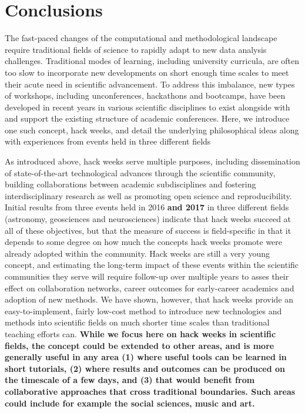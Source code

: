 
\section*{Conclusions}

The fast-paced changes of the computational and methodological landscape require traditional fields of science to rapidly adapt to new data analysis challenges.
Traditional modes of learning, including university curricula, are often too slow to incorporate new developments on short enough time scales to meet their acute need in scientific advancement.
To address this imbalance, new types of workshops, including unconferences, hackathons and bootcamps, have been developed in recent years in various scientific disciplines to exist alongside with and support the existing structure of academic conferences.
Here, we introduce one such concept, hack weeks, and detail the underlying philosophical ideas along with experiences from events held in three different fields

As introduced above, hack weeks serve multiple purposes, including dissemination of state-of-the-art technological advances through the scientific community, building collaborations between academic subdisciplines and fostering interdisciplinary research as well as  promoting open science and reproducibility.
Initial results from three events held in 2016 \textbf{and 2017} in three different fields (astronomy, geosciences and neurosciences) indicate that hack weeks succeed at all of these objectives, but that the measure of success is field-specific in that it depends to some degree on how much the concepts hack weeks promote were already adopted within the community.
Hack weeks are still a very young concept, and estimating the long-term impact of these events within the scientific communities they serve will require follow-up over multiple years to asses their effect on collaboration networks, career outcomes for early-career academics and adoption of new methods.
We have shown, however, that hack weeks provide an easy-to-implement, fairly low-cost method to introduce new technologies and methods into scientific fields on much shorter time scales than traditional teaching efforts can.
\textbf{While we focus here on hack weeks in scientific fields, the concept could be extended to other areas, and is more generally useful in any area (1) where useful tools can be learned in short tutorials, (2) where results and outcomes can be produced on the timescale of a few days, and (3) that would benefit from collaborative approaches that cross traditional boundaries. Such areas could include for example the social sciences, music and art.}